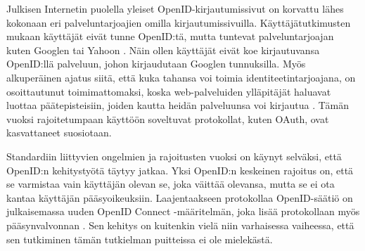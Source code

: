 Julkisen Internetin puolella yleiset OpenID-kir\-jau\-tu\-mis\-si\-vut on korvattu lähes kokonaan eri palveluntarjoajien omilla kirjautumissivuilla. Käyttäjätutkimusten mukaan käyttäjät eivät tunne OpenID:tä, mutta tuntevat palveluntarjoajan kuten Googlen tai Yahoon \cite{refuse_sso}. Näin ollen käyttäjät eivät koe kirjautuvansa OpenID:llä palveluun, johon kirjaudutaan Googlen tunnuksilla. Myös alkuperäinen ajatus siitä, että kuka tahansa voi toimia identiteetintarjoajana, on osoittautunut toimimattomaksi, koska web-palveluiden ylläpitäjät haluavat luottaa päätepisteisiin, joiden kautta heidän palveluunsa voi kirjautua \cite{refuse_sso}. Tämän vuoksi rajoitetumpaan käyttöön soveltuvat protokollat, kuten OAuth, ovat kasvattaneet suosiotaan.

Standardiin liittyvien ongelmien ja rajoitusten vuoksi on käynyt selväksi, että Open\-ID:n kehitystyötä täytyy jatkaa. Yksi OpenID:n keskeinen rajoitus on, että se varmistaa vain käyttäjän olevan se, joka väittää olevansa, mutta se ei ota kantaa käyttäjän pääsyoikeuksiin. Laajentaakseen protokollaa OpenID-säätiö on julkaisemassa uuden OpenID Connect -määritelmän, joka lisää protokollaan myös pääsynvalvonnan \cite{distributed_web_security}. Sen kehitys on kuitenkin vielä niin varhaisessa vaiheessa, että sen tutkiminen tämän tutkielman puitteissa ei ole mielekästä.